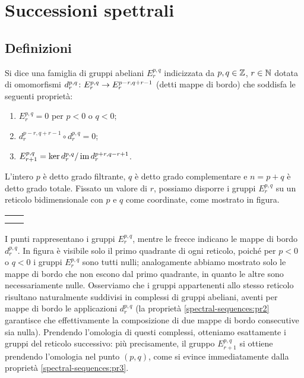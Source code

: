 \chapter{Successioni spettrali}
\label{ch:spectral-sequences}
\section{Definizioni}
\begin{definition}
Si dice  una famiglia di gruppi abeliani \(E^{p,q}_r\) indicizzata da \(p,q\in\mathbb{Z}\), \(r\in\mathbb{N}\) dotata di omomorfismi \(\map{d^{p,q}_r}{E^{p,q}_r}{E^{p-r,q+r-1}_r}\) (detti mappe di bordo) che soddisfa le seguenti proprietà:
\begin{enumerate}
\item\label{spectral-sequences:pr1} \(E^{p,q}_r=0\) per \(p<0\) o \(q<0\);
\item\label{spectral-sequences:pr2} \(d^{p-r,q+r-1}_r\circ d^{p,q}_r=0\);
\item\label{spectral-sequences:pr3} \(E^{p,q}_{r+1}=\ker d^{p,q}_r/\operatorname{im} d^{p+r,q-r+1}_r\).
\end{enumerate}
\end{definition}
L'intero \(p\) è detto grado filtrante, \(q\) è detto grado complementare e \(n=p+q\) è detto grado totale.
Fissato un valore di \(r\), possiamo disporre i gruppi \(E^{p,q}_r\) su un reticolo bidimensionale con \(p\) e \(q\) come coordinate, come mostrato in figura.

\begin{tabularx}{\textwidth}{YY}
&\\
&
\end{tabularx}

I punti rappresentano i gruppi \(E^{p,q}_r\), mentre le frecce indicano le mappe di bordo \(d^{p,q}_r\). In figura è visibile solo il primo quadrante di ogni reticolo, poiché per \(p<0\) o \(q<0\) i gruppi \(E^{p,q}_r\) sono tutti nulli; analogamente abbiamo mostrato solo le mappe di bordo che non escono dal primo quadrante, in quanto le altre sono necessariamente nulle. Osserviamo che i gruppi appartenenti allo stesso reticolo risultano naturalmente suddivisi in complessi di gruppi abeliani, aventi per mappe di bordo le applicazioni \(d^{p,q}_r\) (la proprietà \ref{spectral-sequences:pr2} garantisce che effettivamente la composizione di due mappe di bordo consecutive sia nulla). Prendendo l'omologia di questi complessi, otteniamo esattamente i gruppi del reticolo successivo: più precisamente, il gruppo \(E^{p,q}_{r+1}\) si ottiene prendendo l'omologia nel punto \((p,q)\), come si evince immediatamente dalla proprietà \ref{spectral-sequences:pr3}.

